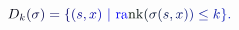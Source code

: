 \documentclass[12pt]{article}
\begin{document}
\makeatletter
\renewcommand*{\@textcolor}[3]{%
  \protect\leavevmode
  \begingroup
    \color#1{#2}#3%
  \endgroup
}
\makeatother
\begin{displaymath}
\mathcolor[RGB]{0,0,15}{D} _ { \mathcolor[RGB]{0,0,30}{k} } \mathcolor[RGB]{0,0,45}{(} \mathcolor[RGB]{0,0,60}{\sigma} \mathcolor[RGB]{0,0,75}{)} \mathcolor[RGB]{0,0,90}{=} \mathcolor[RGB]{0,0,105}{\{} \mathcolor[RGB]{0,0,120}{(} \mathcolor[RGB]{0,0,135}{s} \mathcolor[RGB]{0,0,150}{,} \mathcolor[RGB]{0,0,165}{x} \mathcolor[RGB]{0,0,180}{)} \mathcolor[RGB]{0,0,195}{\nobreakspace} \mathcolor[RGB]{0,0,210}{|} \mathcolor[RGB]{0,0,225}{\nobreakspace} \mathrm { \mathcolor[RGB]{0,0,240}{r} \mathcolor[RGB]{0,0,255}{a} \mathcolor[RGB]{0,15,0}{n} \mathcolor[RGB]{0,15,15}{k} } \mathcolor[RGB]{0,15,30}{(} \mathcolor[RGB]{0,15,45}{\sigma} \mathcolor[RGB]{0,15,60}{(} \mathcolor[RGB]{0,15,75}{s} \mathcolor[RGB]{0,15,90}{,} \mathcolor[RGB]{0,15,105}{x} \mathcolor[RGB]{0,15,120}{)} \mathcolor[RGB]{0,15,135}{)} \mathcolor[RGB]{0,15,150}{\leq} \mathcolor[RGB]{0,15,165}{k} \mathcolor[RGB]{0,15,180}{\}} \mathcolor[RGB]{0,15,195}{.}
\end{displaymath}
\end{document}
